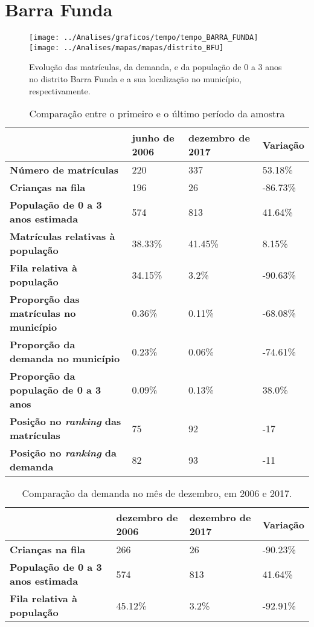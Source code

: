 \section{Barra Funda}
\begin{figure}[H]
	\centering
	\texttt{[image: ../Analises/graficos/tempo/tempo\_BARRA\_FUNDA]}
	\texttt{[image: ../Analises/mapas/mapas/distrito\_BFU]}
	\caption{Evolução das matrículas, da demanda, e da população de 0 a 3 anos no distrito Barra Funda e a sua localização no município, respectivamente.}
\end{figure}
\begin{table}[H]
	\begin{tabular}{|l|l|l|l|}
		\hline
		\textbf{}                                      & \textbf{junho de 2006}       & \textbf{dezembro de 2017}    & \textbf{Variação} \\ \hline
		\textbf{Número de matrículas}                  & 220 & 337 & 53.18\% \\ \hline
		\textbf{Crianças na fila}                      & 196 & 26 & -86.73\% \\ \hline
		\textbf{População de 0 a 3 anos estimada}      & 574 & 813 & 41.64\% \\ \hline
		\textbf{Matrículas relativas à população}      & 38.33\% & 41.45\% & 8.15\% \\ \hline
		\textbf{Fila relativa à população}             & 34.15\% & 3.2\% & -90.63\% \\ \hline
		\textbf{Proporção das matrículas no município} & 0.36\% & 0.11\% & -68.08\% \\ \hline
		\textbf{Proporção da demanda no município}     & 0.23\% & 0.06\% & -74.61\% \\ \hline
		\textbf{Proporção da população de 0 a 3 anos}  & 0.09\% & 0.13\% & 38.0\% \\ \hline
		\textbf{Posição no \textit{ranking} das matrículas}     & 75 & 92 & -17 \\ \hline
		\textbf{Posição no \textit{ranking} da demanda}         & 82 & 93 & -11 \\ \hline
	\end{tabular}
	\caption{Comparação entre o primeiro e o último período da amostra}
\end{table}
\begin{table}[H]
	\begin{tabular}{|l|l|l|l|}
		\hline
		\textbf{}                                 & \textbf{dezembro de 2006} & \textbf{dezembro de 2017} & \textbf{Variação} \\ \hline
		\textbf{Crianças na fila}                      & 266 & 26 & -90.23\% \\ \hline
		\textbf{População de 0 a 3 anos estimada}      & 574 & 813 & 41.64\% \\ \hline
		\textbf{Fila relativa à população}             & 45.12\% & 3.2\% & -92.91\% \\ \hline
	\end{tabular}
	\caption{Comparação da demanda no mês de dezembro, em 2006 e 2017.}
\end{table}
